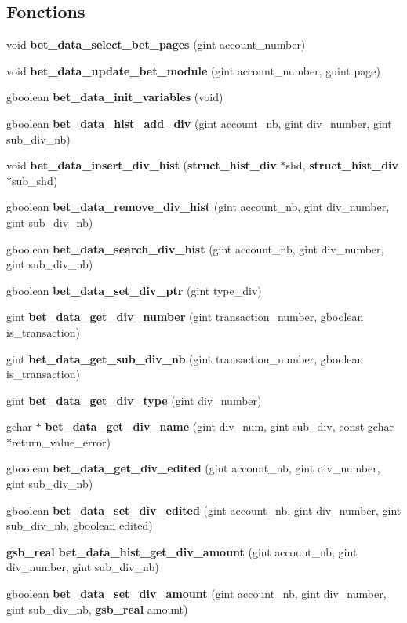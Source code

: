 \subsection*{Fonctions}
\begin{DoxyCompactItemize}
\item 
void {\bf bet\_\-data\_\-select\_\-bet\_\-pages} (gint account\_\-number)
\item 
void {\bf bet\_\-data\_\-update\_\-bet\_\-module} (gint account\_\-number, guint page)
\item 
gboolean {\bf bet\_\-data\_\-init\_\-variables} (void)
\item 
gboolean {\bf bet\_\-data\_\-hist\_\-add\_\-div} (gint account\_\-nb, gint div\_\-number, gint sub\_\-div\_\-nb)
\item 
void {\bf bet\_\-data\_\-insert\_\-div\_\-hist} ({\bf struct\_\-hist\_\-div} $\ast$shd, {\bf struct\_\-hist\_\-div} $\ast$sub\_\-shd)
\item 
gboolean {\bf bet\_\-data\_\-remove\_\-div\_\-hist} (gint account\_\-nb, gint div\_\-number, gint sub\_\-div\_\-nb)
\item 
gboolean {\bf bet\_\-data\_\-search\_\-div\_\-hist} (gint account\_\-nb, gint div\_\-number, gint sub\_\-div\_\-nb)
\item 
gboolean {\bf bet\_\-data\_\-set\_\-div\_\-ptr} (gint type\_\-div)
\item 
gint {\bf bet\_\-data\_\-get\_\-div\_\-number} (gint transaction\_\-number, gboolean is\_\-transaction)
\item 
gint {\bf bet\_\-data\_\-get\_\-sub\_\-div\_\-nb} (gint transaction\_\-number, gboolean is\_\-transaction)
\item 
gint {\bf bet\_\-data\_\-get\_\-div\_\-type} (gint div\_\-number)
\item 
gchar $\ast$ {\bf bet\_\-data\_\-get\_\-div\_\-name} (gint div\_\-num, gint sub\_\-div, const gchar $\ast$return\_\-value\_\-error)
\item 
gboolean {\bf bet\_\-data\_\-get\_\-div\_\-edited} (gint account\_\-nb, gint div\_\-number, gint sub\_\-div\_\-nb)
\item 
gboolean {\bf bet\_\-data\_\-set\_\-div\_\-edited} (gint account\_\-nb, gint div\_\-number, gint sub\_\-div\_\-nb, gboolean edited)
\item 
{\bf gsb\_\-real} {\bf bet\_\-data\_\-hist\_\-get\_\-div\_\-amount} (gint account\_\-nb, gint div\_\-number, gint sub\_\-div\_\-nb)
\item 
gboolean {\bf bet\_\-data\_\-set\_\-div\_\-amount} (gint account\_\-nb, gint div\_\-number, gint sub\_\-div\_\-nb, {\bf gsb\_\-real} amount)

\end{DoxyCompactItemize}
